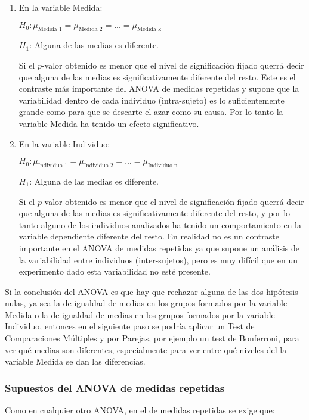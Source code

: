 \begin{enumerate}
\item En la variable Medida:

$H_0: \mu_{\text{Medida 1}}=\mu_{\text{Medida 2}}=...=\mu_{\text{Medida k}}$

$H_1$: Alguna de las medias es diferente.

Si el $p$-valor obtenido es menor que el nivel de significación fijado querrá decir que alguna de las medias es significativamente diferente del resto. Este es el contraste más importante del ANOVA de medidas repetidas y supone que la variabilidad dentro de cada individuo (intra-sujeto) es lo suficientemente grande como para que se descarte el azar como su causa. Por lo tanto la variable Medida ha tenido un efecto significativo.

\item En la variable Individuo:

$H_0: \mu_{\text{Individuo 1}}=\mu_{\text{Individuo 2}}=...=\mu_{\text{Individuo n}}$

$H_1$: Alguna de las medias es diferente.

Si el $p$-valor obtenido es menor que el nivel de significación fijado querrá decir que alguna de las medias es significativamente diferente del resto, y por lo tanto alguno de los individuos analizados ha tenido un comportamiento en la variable dependiente diferente del resto. En realidad no es un contraste importante en el ANOVA de medidas repetidas ya que supone un análisis de la variabilidad entre individuos (inter-sujetos), pero es muy difícil que en un experimento dado esta variabilidad no esté presente.
\end{enumerate}

Si la conclusión del ANOVA es que hay que rechazar alguna de las dos hipótesis nulas, ya sea la de igualdad de medias en los grupos formados
por la variable Medida o la de igualdad de medias en los grupos formados por la variable Individuo, entonces en el siguiente paso se podría
aplicar un Test de Comparaciones Múltiples y por Parejas, por ejemplo un test de Bonferroni, para ver qué medias son diferentes,
especialmente para ver entre qué niveles del la variable Medida se dan las diferencias.


\subsubsection{Supuestos del ANOVA de medidas repetidas}
Como en cualquier otro ANOVA, en el de medidas repetidas se exige que:

